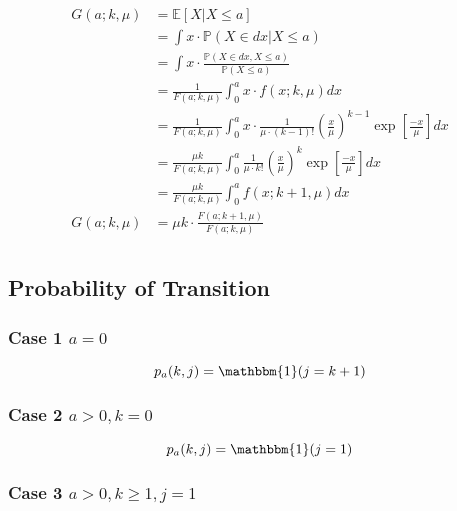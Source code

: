 \documentclass{article}
\begin{document}
\begin{align*}
	G (a; k, \mu) & = \mathbb{E} [X | X \leq a] \\
	& = \int x \cdot \mathbb{P} (X \in dx | X \leq a) \\
	& = \int x \cdot \frac{\mathbb{P} (X \in dx, X \leq a)}{\mathbb{P} (X \leq a)} \\
	& = \frac{1}{F (a; k, \mu)} \int_{0}^{a} x \cdot f (x; k, \mu) d x \\
	& = \frac{1}{F (a; k, \mu)} \int_{0}^{a} x \cdot \frac{1}{\mu \cdot (k - 1)!} \left( \frac{x}{\mu} \right)^{k - 1} \exp \left[ \frac{-x}{\mu} \right] d x \\
	& = \frac{\mu k}{F (a; k, \mu)} \int_{0}^{a} \frac{1}{\mu \cdot k!} \left( \frac{x}{\mu} \right)^{k} \exp \left[ \frac{-x}{\mu} \right] d x \\
	& = \frac{\mu k}{F (a; k, \mu)} \int_{0}^{a} f (x; k + 1, \mu) d x \\
	G (a; k, \mu) & = \mu k \cdot \frac{F (a; k + 1, \mu)}{F (a; k, \mu)} \\
\end{align*}

\subsection{Probability of Transition}

\subsubsection{Case 1 $a = 0$}

\begin{equation*}
	p_{a} (k, j) = \mathbbm{1} (j = k + 1) \\
\end{equation*}

\subsubsection{Case 2 $a > 0, k = 0$}

\begin{equation*}
	p_{a} (k, j) = \mathbbm{1} (j = 1) \\
\end{equation*}

\subsubsection{Case 3 $a > 0, k \geq 1, j = 1$}
\end{document}
